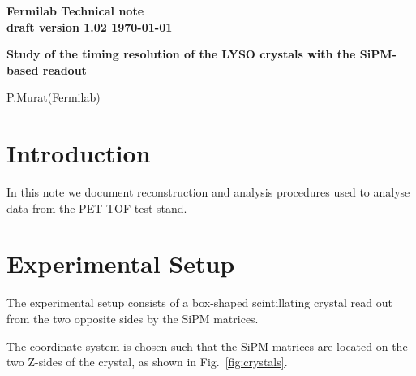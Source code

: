 \documentclass[aps,prd,showpacs,preprint,groupedaddress]{revtex4}  %
\begin{document}
\begin{titlepage}

  \begin{flushright}
    \bf Fermilab Technical note  \\
    draft version 1.02
    \today
  \end{flushright}
  
  \vspace{1cm}
  
  \begin{center} {
      \Large \bf
      Study of the timing resolution of the LYSO crystals with the SiPM-based readout
    }

    \vspace{1cm}

    { 
      P.Murat(Fermilab)
    }

 \end{center}

  \vspace{1cm}

  \begin{abstract}
    Results of the study, look at the method

  \end{abstract}

\end{titlepage} 

{\tableofcontents}

\section{Introduction}

In this note we document reconstruction and analysis procedures used to analyse
data from the PET-TOF test stand.

\section{Experimental Setup}

The experimental setup consists of a box-shaped scintillating crystal 
read out from the two opposite sides by the SiPM matrices. 

The coordinate system is chosen such that the SiPM matrices are located on the 
two Z-sides of the crystal, as shown in Fig.~\ref{fig:crystals}.
\end{document}
